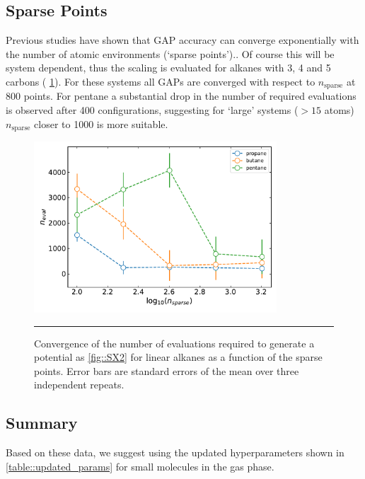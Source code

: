\documentclass[11pt]{article}
\numberwithin{equation}{subsection}
\begin{document}
\newpage
\subsection{Sparse Points}

Previous studies have shown that GAP accuracy can converge exponentially with the number of atomic environments (`sparse points').\cite{Rowe2020}. Of course this will be system dependent, thus the scaling is evaluated for alkanes with 3, 4 and 5 carbons (\figurename{ \ref{fig::SX21}}). For these systems all GAPs are converged with respect to $n_\text{sparse}$ at 800 points. For pentane a substantial drop in the number of required evaluations is observed after 400 configurations, suggesting for `large' systems ($>15$ atoms) $n_\text{sparse}$ closer to 1000 is more suitable.


\begin{figure}[h!]
	\centering
	\includegraphics[height=6.4cm]{figSX21.pdf}
	\vspace{0.1cm}
	\hrule
	\vspace{0.1cm}
	\caption{Convergence of the number of evaluations required to generate a potential as \figurename{ \ref{fig::SX2}} for linear alkanes as a function of the sparse points. Error bars are standard errors of the mean over three independent repeats.}
	\label{fig::SX21}
\end{figure}


\subsection{Summary}

Based on these data, we suggest using the updated hyperparameters shown in \tablename{ \ref{table::updated_params}} for small molecules in the gas phase.
\end{document}

